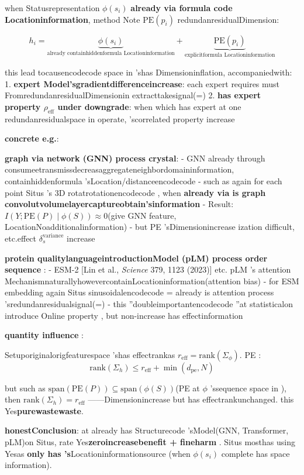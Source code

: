 \documentclass[
  12pt,
]{article}
\begin{document}
when Statusrepresentation \(\phi(s_i)\) \textbf{already via formula code Locationinformation}, method Note 
\(\text{PE}(p_i)\) redundanresidualDimension: 

\[h_i = \underbrace{\phi(s_i)}_{\text{already containhiddenformula Locationinformation}} + \underbrace{\text{PE}(p_i)}_{\text{explicitformula Locationinformation}}\]

this lead tocausencodecode space in 'shas Dimensioninflation, accompaniedwith:  1.
\textbf{expert Model'sgradientdifferenceincrease}: each expert requires must FromredundanresidualDimensionin extracttakesignal(=) 2.
\textbf{has expert property  \(\rho_{\text{eff}}\)
under downgrade}: when which has expert at one redundanresidualspace in operate, 'scorrelated property increase

\textbf{concrete e.g.}: 

\textbf{graph via network  (GNN) process crystal}:  - GNN
already through consumeetransmissdecreasaggregateneighbordomaininformation, containhiddenformula 'sLocation/distanceencodecode  -
such as again for each point  Situs 's 3D
rotatrotationencodecode , when \textbf{already via is graph convolutvolumelayercaptureobtain'sinformation} -
Result: \(I(Y; \text{PE}(P) \mid \phi(S)) \approx 0\)(give  GNN
feature, LocationNoadditionalinformation) - but  PE 'sDimensionincrease ization difficult, etc.effect
\(\delta_s^{\text{variance}}\) increase

\textbf{protein qualitylanguageintroductionModel (pLM) process order sequence }:  - ESM-2 {[}Lin et al.,
\emph{Science} 379, 1123 (2023){]} etc. pLM 's attention
MechanismnaturallyhowevercontainLocationinformation(attention bias) - for  ESM embedding again  Situs
 sinusoidalencodecode  = already is  attention process 'sredundanresidualsignal(=) -
this ''doubleimportantencodecode ''at statisticalon introduce Online property , but non-increase has effectinformation

\textbf{quantity influence }: 

Setuporiginalorigfeaturespace 'shas effectrankas 
\(r_{\text{eff}} = \text{rank}(\Sigma_\phi)\).  PE : 
\[\text{rank}(\Sigma_h) \leq r_{\text{eff}} + \min(d_{\text{pe}}, N)\]

but such as  \(\text{span}(\text{PE}(P)) \subseteq \text{span}(\phi(S))\)(PE
at  \(\phi\) 'ssequence space in ), then  \(\text{rank}(\Sigma_h) = r_{\text{eff}}\)
------Dimensionincrease but has effectrankunchanged. this Yes\textbf{purewastewaste}. 

\textbf{honestConclusion}: at already has Structurecode 'sModel(GNN, Transformer, pLM)on  
Situs, rate Yes\textbf{zeroincreasebenefit + fineharm }. Situs
mosthas using Yesas \textbf{only has 's}Locationinformationsource (when  \(\phi(s_i)\)
complete has space information). 
\end{document}

